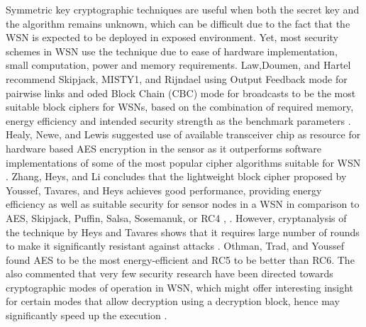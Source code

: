 \documentclass[conference,final]{IEEEtran}
\begin{document}
Symmetric key cryptographic techniques are useful when both the secret key and the algorithm remains unknown, which can be difficult due to the fact that the WSN is expected to be deployed in exposed environment. Yet, most security schemes in WSN use the technique due to ease of hardware implementation, small computation, power and memory requirements. 
Law,Doumen, and Hartel recommend Skipjack, MISTY1, and Rijndael using Output Feedback mode for pairwise links and oded Block Chain (CBC) mode for broadcasts to be the most suitable block ciphers for WSNs, based on the combination of required memory, energy efficiency and intended security strength as the benchmark parameters \cite{ISI:000205012800003}. 
Healy, Newe, and Lewis suggested use of available transceiver chip as resource for hardware based AES encryption in the sensor as it outperforms software implementations of some of the most popular cipher algorithms suitable for WSN \cite{9783540795902}.
Zhang, Heys, and Li concludes that the lightweight  block cipher proposed by Youssef, Tavares,  and Heys achieves good performance, providing  energy efficiency as well as suitable security for sensor nodes  in a WSN in comparison to AES, Skipjack, Puffin, Salsa, Sosemanuk, or RC4 \cite{5472979},  \cite{youssef1996new}. 
However, cryptanalysis of the technique by Heys and Tavares shows that it requires large number of rounds to make it significantly resistant against attacks \cite{Heys:1996:CSP} .
Othman, Trad, and Youssef found AES to be the most energy-efficient and RC5 to be better than RC6. 
The also commented that very few security research have been directed towards cryptographic modes of operation in WSN, which might offer interesting insight for certain modes that allow decryption using a decryption block, hence may significantly speed up the execution \cite{6216690}.
\end{document}
